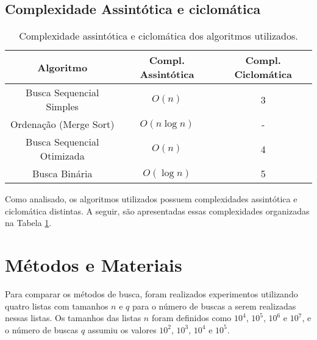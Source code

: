 \documentclass[12pt]{article}
\begin{document}
    







\subsection{Complexidade Assintótica e ciclomática} 

    \begin{table}[h]
        \centering
        \caption{Complexidade assintótica e ciclomática dos algoritmos utilizados.}
        \begin{tabular}{|c|c|c|}
            \hline
            \textbf{Algoritmo} & \textbf{Compl. Assintótica} & \textbf{Compl. Ciclomática} \\
            \hline
            Busca Sequencial Simples & \(O(n)\) & 3 \\
            \hline
            Ordenação (Merge Sort) & \(O(n \log n)\) & - \\
            \hline
            Busca Sequencial Otimizada & \(O(n)\) & 4 \\
            \hline
            Busca Binária & \(O(\log n)\) & 5 \\
            \hline
        \end{tabular}
        \label{tab:ciclotematica}
    \end{table}

    Como analisado, os algoritmos utilizados possuem complexidades assintótica e ciclomática distintas. A seguir, são apresentadas essas complexidades organizadas na Tabela \ref{tab:ciclotematica}.



\section{Métodos e Materiais}
    Para comparar os métodos de busca, foram realizados experimentos utilizando quatro listas com tamanhos \(n\) e \(q\) para o número de buscas a serem realizadas nessas listas. Os tamanhos das listas \(n\) foram definidos como \(10^4\), \(10^5\), \(10^6\) e \(10^7\), e o número de buscas \(q\) assumiu os valores \(10^2\), \(10^3\), \(10^4\) e \(10^5\).
    
\end{document}
